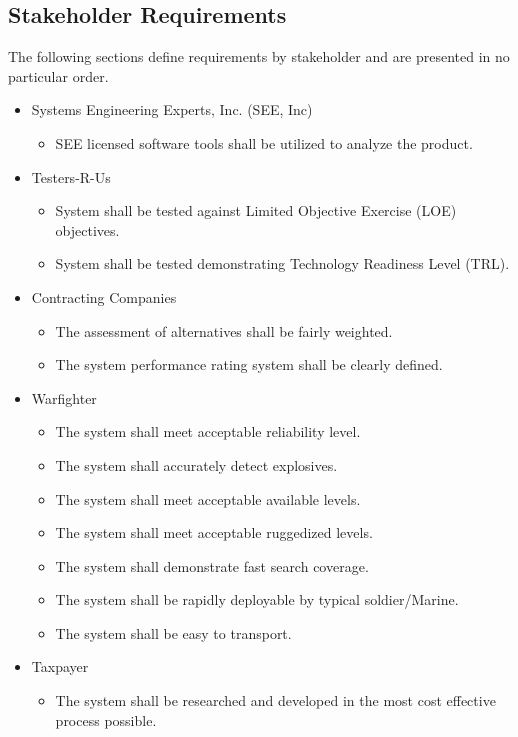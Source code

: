 \documentclass[letterpaper,10pt]{article}
\begin{document}
\subsection{Stakeholder Requirements}
The following sections define requirements by stakeholder and are presented in no particular order.

\begin{itemize}
	\item Systems Engineering Experts, Inc. (SEE, Inc)
	\begin{itemize}
		\item SEE licensed software tools shall be utilized to analyze the product.
	\end{itemize}
	\item Testers-R-Us
	\begin{itemize}
		\item System shall be tested against Limited Objective Exercise (LOE) objectives.
		\item System shall be tested demonstrating Technology Readiness Level (TRL).
	\end{itemize}
	\item Contracting Companies
	\begin{itemize}
		\item The assessment of alternatives shall be fairly weighted.
		\item The system performance rating system shall be clearly defined.
	\end{itemize}
	\item Warfighter
	\begin{itemize}
		\item The system shall meet acceptable reliability level.
		\item The system shall accurately detect explosives.
		\item The system shall meet acceptable available levels.
		\item The system shall meet acceptable ruggedized levels.
		\item The system shall demonstrate fast search coverage.
		\item The system shall be rapidly deployable by typical soldier/Marine.
		\item The system shall be easy to transport.
	\end{itemize}
	\item Taxpayer
	\begin{itemize}
		\item The system shall be researched and developed in the most cost effective process possible.

\end{itemize}
\end{itemize}
\end{document}
